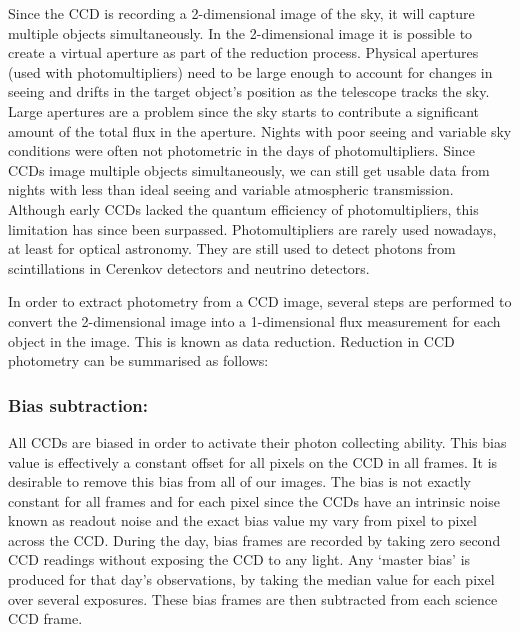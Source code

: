Since the CCD is recording a 2-dimensional image of the sky, it will capture multiple objects simultaneously. In the 2-dimensional image it is possible to create a virtual aperture as part of the reduction process. Physical apertures (used with photomultipliers) need to be large enough to account for changes in seeing and drifts in the target object's position as the telescope tracks the sky. Large apertures are a problem since the sky starts to contribute a significant amount of the total flux in the aperture. Nights with poor seeing and variable sky conditions were often not photometric in the days of photomultipliers. Since CCDs image multiple objects simultaneously, we can still get usable data from nights with less than ideal seeing and variable atmospheric transmission.  Although early CCDs lacked the quantum efficiency of photomultipliers, this limitation has since been surpassed. Photomultipliers are rarely used nowadays, at least for optical astronomy. They are still used to detect photons from scintillations in Cerenkov detectors and neutrino detectors.  

In order to extract photometry from a CCD image, several steps are performed to convert the 2-dimensional image into a 1-dimensional flux measurement for each object in the image. This is known as data reduction. Reduction in CCD photometry can be summarised as follows: 

\subsubsection{Bias subtraction:}
All CCDs are biased in order to activate their photon collecting ability. This bias value is effectively a constant offset for all pixels on the CCD in all frames. It is desirable to remove this bias from all of our images. The bias is not exactly constant for all frames and for each pixel since the CCDs have an intrinsic noise known as readout noise and the exact bias value my vary from pixel to pixel across the CCD.  During the day, bias frames are recorded by taking zero second CCD readings without exposing the CCD to any light. Any `master bias' is produced for that day's observations, by taking the median value for each pixel over several exposures. These bias frames are then subtracted from each science CCD frame. 

